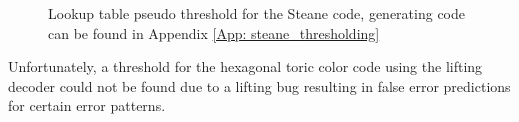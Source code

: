 \begin{figure}[h!]
	\centering
	\captionsetup{justification=centering,margin=2cm}
    \hfill
	\hfill
	\caption{Lookup table pseudo threshold for the Steane code, generating code can be found in Appendix
    \ref{App: steane_thresholding}}
        
	\label{fig: steane_threshold}
\end{figure}


Unfortunately, a threshold for the hexagonal toric color code using the lifting
decoder could not be found due to a lifting bug resulting in false error predictions 
for certain error patterns.

\newpage